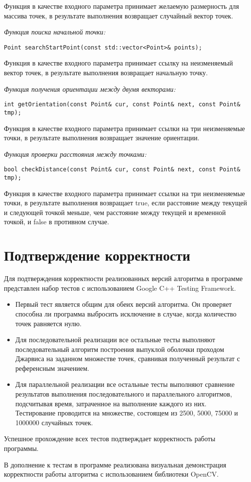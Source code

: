 \documentclass{report}
\begin{document}
Функция в качестве входного параметра принимает желаемую размерность для массива точек, в результате выполнения возвращает случайный вектор точек.
\par \textit{Функция поиска начальной точки:}
\begin{lstlisting}
Point searchStartPoint(const std::vector<Point>& points);
\end{lstlisting}
Функция в качестве входного параметра принимает ссылку на неизменяемый вектор точек, в результате выполнения возвращает начальную точку.
\par \textit{Функция получения ориентации между двумя векторами:}
\begin{lstlisting}
int getOrientation(const Point& cur, const Point& next, const Point& tmp);
\end{lstlisting}
Функция в качестве входного параметра принимает ссылки на три неизменяемые точки, в результате выполнения возвращает значение ориентации.
\par \textit{Функция проверки расстояния между точками:}
\begin{lstlisting}
bool checkDistance(const Point& cur, const Point& next, const Point& tmp);
\end{lstlisting}
Функция в качестве входного параметра принимает ссылки на три неизменяемые точки, в результате выполнения возвращает true, если расстояние между текущей и следующей точкой меньше, чем расстояние между текущей и временной точкой, и false в противном случае.
\newpage

\section*{Подтверждение корректности}
\par Для подтверждения корректности реализованных версий алгоритма в программе представлен набор тестов с использованием Google C++ Testing Framework. 
\begin{itemize}
\item Первый тест является общим для обеих версий алгоритма. Он проверяет способна ли программа выбросить исключение в случае, когда количество точек равняется нулю.
\item Для последовательной реализации все остальные тесты выполняют последовательный алгоритм построения выпуклой оболочки проходом Джарвиса на заданном множестве точек, сравнивая полученный результат с референсным значением.
\item Для параллельной реализации все остальные тесты выполняют сравнение результатов выполнения последовательного и параллельного алгоритмов, подсчитывая время, затраченное на выполнение каждого из них. Тестирование проводится на множестве, состоящем из 2500, 5000, 75000 и 1000000 случайных точек.
\end{itemize}
\par Успешное прохождение всех тестов подтверждает корректность работы программы.
\par В дополнение к тестам в программе реализована визуальная демонстрация корректности работы алгоритма с использованием библиотеки OpenCV.
\newpage
\end{document}
